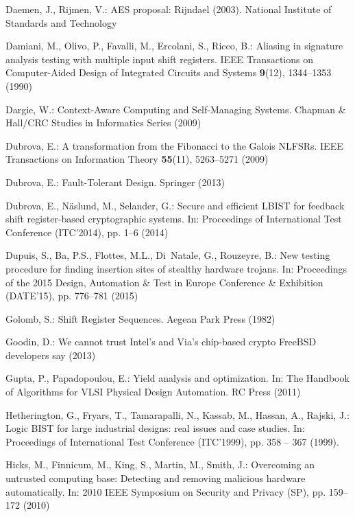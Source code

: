 \documentclass[a4paper]{llncs}
\begin{document}
\begin{thebibliography}{10}
Daemen, J., Rijmen, V.: {AES} proposal: Rijndael (2003).
\newblock National Institute of Standards and Technology

Damiani, M., Olivo, P., Favalli, M., Ercolani, S., Ricco, B.: Aliasing in
  signature analysis testing with multiple input shift registers.
\newblock IEEE Transactions on Computer-Aided Design of Integrated Circuits and
  Systems \textbf{9}(12), 1344--1353 (1990)

Dargie, W.: Context-Aware Computing and Self-Managing Systems.
\newblock Chapman \& Hall/CRC Studies in Informatics Series (2009)

Dubrova, E.: A transformation from the {F}ibonacci to the {G}alois {NLFSR}s.
\newblock IEEE Transactions on Information Theory \textbf{55}(11), 5263--5271
  (2009)

Dubrova, E.: Fault-Tolerant Design.
\newblock Springer (2013)

Dubrova, E., N\"aslund, M., Selander, G.: Secure and efficient {LBIST} for
  feedback shift register-based cryptographic systems.
\newblock In: Proceedings of International Test Conference (ITC'2014), pp. 1--6
  (2014)

Dupuis, S., Ba, P.S., Flottes, M.L., Di~Natale, G., Rouzeyre, B.: New testing
  procedure for finding insertion sites of stealthy hardware trojans.
\newblock In: Proceedings of the 2015 Design, Automation \& Test in Europe
  Conference \& Exhibition (DATE'15), pp. 776--781 (2015)

Golomb, S.: Shift Register Sequences.
\newblock Aegean Park Press (1982)

Goodin, D.: We cannot trust {I}ntel's and {V}ia's chip-based crypto {FreeBSD}
  developers say (2013)

Gupta, P., Papadopoulou, E.: Yield analysis and optimization.
\newblock In: The Handbook of Algorithms for VLSI Physical Design Automation.
  RC Press (2011)

Hetherington, G., Fryars, T., Tamarapalli, N., Kassab, M., Hassan, A., Rajski,
  J.: Logic {BIST} for large industrial designs: real issues and case studies.
\newblock In: Proceedings of International Test Conference (ITC'1999), pp. 358
  -- 367 (1999).
\newblock {}

Hicks, M., Finnicum, M., King, S., Martin, M., Smith, J.: Overcoming an
  untrusted computing base: Detecting and removing malicious hardware
  automatically.
\newblock In: 2010 IEEE Symposium on Security and Privacy (SP), pp. 159--172
  (2010)


\end{thebibliography}
\end{document}
